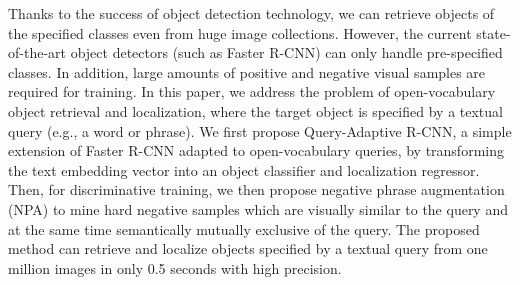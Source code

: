 Thanks to the success of object detection technology, we can retrieve objects of the specified classes even from huge image collections. However, the current state-of-the-art object detectors (such as Faster R-CNN) can only handle pre-specified classes.  In addition, large amounts of positive and negative visual samples are required for training.  In this paper, we address the problem of open-vocabulary object retrieval and localization, where the target object is specified by a textual query (e.g., a word or phrase).  We first propose Query-Adaptive R-CNN, a simple extension of Faster R-CNN adapted to open-vocabulary queries, by transforming the text embedding vector into an object classifier and localization regressor.  Then, for discriminative training, we then propose negative phrase augmentation (NPA) to mine hard negative samples which are visually similar to the query and at the same time semantically mutually exclusive of the query.  The proposed method can retrieve and localize objects specified by a textual query from one million images in only 0.5 seconds with high precision.
